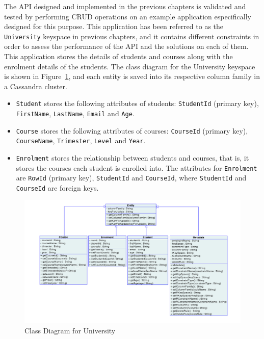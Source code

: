 The  \ac{API} designed and implemented in the previous chapters is validated and
tested by performing \ac{CRUD} operations on an example application
especifically designed for this purpose. This application has been referred to
as the \texttt{University} keyspace in previous chapters, and it contains
different constraints in order to  assess the performance of the \ac{API} and
the solutions on each of them. This application stores the details of students and
 courses along with the enrolment details of the students. The class diagram for
 the University keyspace is shown in Figure~\ref{fexp:ClassDiagram}, and each
 entity is saved into its respective column family in a Cassandra cluster.

	\begin{itemize}
	  \item \texttt{Student} stores the  following attributes of students:
	   \texttt{StudentId} (primary key), \texttt{FirstName}, \texttt{LastName},
	  \texttt{Email} and \texttt{Age}.
	  \item \texttt{Course} stores  the following  attributes of courses:
	  \texttt{CourseId} (primary key), \texttt{CourseName}, \texttt{Trimester},
	  \texttt{Level} and \texttt{Year}.
	  \item \texttt{Enrolment} stores the  relationship between
	  students and courses, that is, it stores the courses each student is enrolled
	  into.  The attributes for \texttt{Enrolment} are \texttt{RowId} (primary
	  key), \texttt{StudentId} and \texttt{CourseId}, where \texttt{StudentId}
	  and \texttt{CourseId} are foreign keys.
	\end{itemize}
	
	\begin{figure}[h] \centering
		\includegraphics[width=1\textwidth]{./figure/Solutions/classdiagram-experimental.png}
		\caption{Class Diagram for University}\label{fexp:ClassDiagram}
	\end{figure} 

